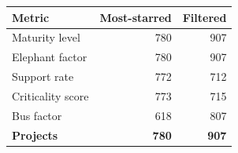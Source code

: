 \begin{tabular}{lrr}
\toprule
Metric & Most-starred & Filtered \\
\midrule
Maturity level & 780 & 907 \\
Elephant factor & 780 & 907 \\
Support rate & 772 & 712 \\
Criticality score & 773 & 715 \\
Bus factor & 618 & 807 \\
\midrule
\textbf{Projects} & \textbf{780} & \textbf{907} \\
\bottomrule
\end{tabular}
